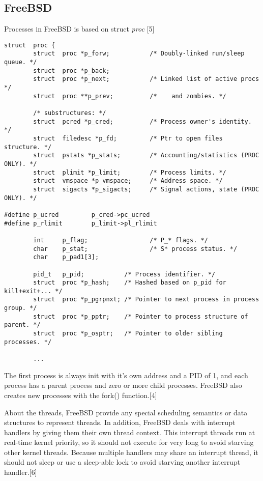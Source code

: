 \documentclass[onecolumn, draftclsnofoot,10pt, compsoc]{IEEEtran}
\begin{document}
\subsection{FreeBSD}
Processes in FreeBSD is based on struct \textit{proc} [5]

\begin{lstlisting}[caption={Excerpt from \textit{proc} structure}]
struct  proc {
        struct  proc *p_forw;           /* Doubly-linked run/sleep queue. */
        struct  proc *p_back;
        struct  proc *p_next;           /* Linked list of active procs */
        struct  proc **p_prev;          /*    and zombies. */

        /* substructures: */
        struct  pcred *p_cred;          /* Process owner's identity. */
        struct  filedesc *p_fd;         /* Ptr to open files structure. */
        struct  pstats *p_stats;        /* Accounting/statistics (PROC ONLY). */
        struct  plimit *p_limit;        /* Process limits. */
        struct  vmspace *p_vmspace;     /* Address space. */
        struct  sigacts *p_sigacts;     /* Signal actions, state (PROC ONLY). */

#define p_ucred         p_cred->pc_ucred
#define p_rlimit        p_limit->pl_rlimit

        int     p_flag;                 /* P_* flags. */
        char    p_stat;                 /* S* process status. */
        char    p_pad1[3];

        pid_t   p_pid;           /* Process identifier. */
        struct  proc *p_hash;    /* Hashed based on p_pid for kill+exit+... */
        struct  proc *p_pgrpnxt; /* Pointer to next process in process group. */
        struct  proc *p_pptr;    /* Pointer to process structure of parent. */
        struct  proc *p_osptr;   /* Pointer to older sibling processes. */
        
        ...

\end{lstlisting}

The first process is always init with it's own address and a PID of 1, and each process has a parent process and zero or more child processes. FreeBSD also creates new processes with the fork() function.[4] 

About the threads, FreeBSD provide any special scheduling semantics or data structures to represent threads. In addition, FreeBSD deals with interrupt handlers by giving them their own thread context. This interrupt threads run at real-time kernel priority, so it should not execute for very long to avoid starving other kernel threads. Because multiple handlers may share an interrupt thread, it should not sleep or use a sleep-able lock to avoid starving another interrupt handler.[6] 
\end{document}
